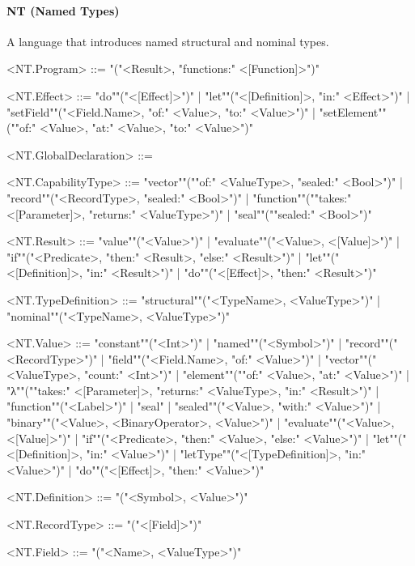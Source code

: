 \documentclass[main.tex]{subfiles}
\begin{document}
\paragraph{ NT (Named Types) } A language that introduces named structural and nominal types.
\begin{grammar}
	\footnotesize
				<NT.Program> ::=
							"("<Result>, "functions:" <[Function]>")"
				\par
				<NT.Effect> ::=
						"do""("<[Effect]>")"
						| "let""("<[Definition]>, "in:" <Effect>")"
						| "setField""("<Field.Name>, "of:" <Value>, "to:" <Value>")"
						| "setElement""(""of:" <Value>, "at:" <Value>, "to:" <Value>")"
				\par
				<NT.GlobalDeclaration> ::=
				\par
				<NT.CapabilityType> ::=
						"vector""(""of:" <ValueType>, "sealed:" <Bool>")"
						| "record""("<RecordType>, "sealed:" <Bool>")"
						| "function""(""takes:" <[Parameter]>, "returns:" <ValueType>")"
						| "seal""(""sealed:" <Bool>")"
				\par
				<NT.Result> ::=
						"value""("<Value>")"
						| "evaluate""("<Value>, <[Value]>")"
						| "if""("<Predicate>, "then:" <Result>, "else:" <Result>")"
						| "let""("<[Definition]>, "in:" <Result>")"
						| "do""("<[Effect]>, "then:" <Result>")"
				\par
				<NT.TypeDefinition> ::=
						"structural""("<TypeName>, <ValueType>")"
						| "nominal""("<TypeName>, <ValueType>")"
				\par
				<NT.Value> ::=
						"constant""("<Int>")"
						| "named""("<Symbol>")"
						| "record""("<RecordType>")"
						| "field""("<Field.Name>, "of:" <Value>")"
						| "vector""("<ValueType>, "count:" <Int>")"
						| "element""(""of:" <Value>, "at:" <Value>")"
						| "λ""(""takes:" <[Parameter]>, "returns:" <ValueType>, "in:" <Result>")"
						| "function""("<Label>")"
						| "seal"
						| "sealed""("<Value>, "with:" <Value>")"
						| "binary""("<Value>, <BinaryOperator>, <Value>")"
						| "evaluate""("<Value>, <[Value]>")"
						| "if""("<Predicate>, "then:" <Value>, "else:" <Value>")"
						| "let""("<[Definition]>, "in:" <Value>")"
						| "letType""("<[TypeDefinition]>, "in:" <Value>")"
						| "do""("<[Effect]>, "then:" <Value>")"
				\par
				<NT.Definition> ::=
							"("<Symbol>, <Value>")"
				\par
				<NT.RecordType> ::=
							"("<[Field]>")"
				\par
				<NT.Field> ::=
							"("<Name>, <ValueType>")"

\end{grammar}
\end{document}
